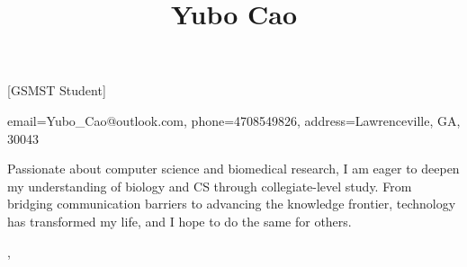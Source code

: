 \documentclass[sidebar-width=2in, primary=slate, linespace=1.2]{clean-resume}
\begin{document}
  \begin{sidebar}
    
    \title{Yubo Cao}[GSMST Student]
    
    
    \contact
    {
      email={Yubo\_Cao@outlook.com},
      phone=4708549826,
      address={Lawrenceville, GA, 30043}
    }
    
    
    Passionate about computer science and biomedical research, I am eager to deepen my understanding of biology and CS through collegiate-level study. From bridging communication barriers to advancing the knowledge frontier, technology has transformed my life, and I hope to do the same for others.
  \end{sidebar}%
  \sep%
\end{document}
